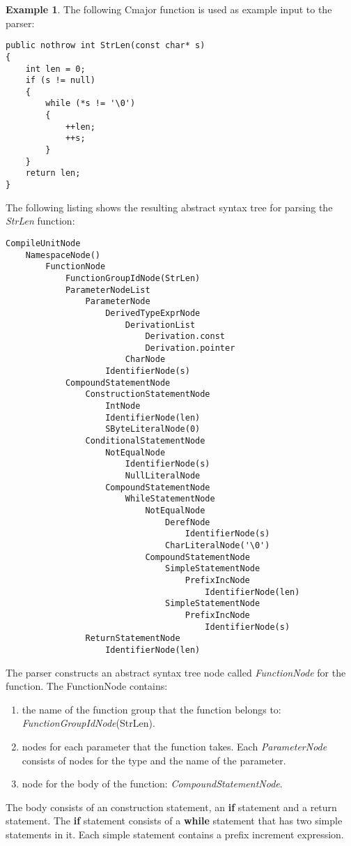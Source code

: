 \documentclass[a4paper,oneside,11pt]{book}
\theoremstyle{definition}
\newtheorem{exmp}{Example}[section]
\begin{document}
\begin{exmp}
The following Cmajor function is used as example input to the parser:

\lstset{language=Cmajor}
\begin{lstlisting}[frame=trBL]
public nothrow int StrLen(const char* s)
{
    int len = 0;
    if (s != null)
    {
        while (*s != '\0')
        {
            ++len;
            ++s;
        }
    }
    return len;
}
\end{lstlisting}

The following listing shows the resulting abstract syntax tree for parsing the \emph{StrLen} function:

\begin{verbatim}
CompileUnitNode
    NamespaceNode()
        FunctionNode
            FunctionGroupIdNode(StrLen)
            ParameterNodeList
                ParameterNode
                    DerivedTypeExprNode
                        DerivationList
                            Derivation.const
                            Derivation.pointer
                        CharNode
                    IdentifierNode(s)
            CompoundStatementNode
                ConstructionStatementNode
                    IntNode
                    IdentifierNode(len)
                    SByteLiteralNode(0)
                ConditionalStatementNode
                    NotEqualNode
                        IdentifierNode(s)
                        NullLiteralNode
                    CompoundStatementNode
                        WhileStatementNode
                            NotEqualNode
                                DerefNode
                                    IdentifierNode(s)
                                CharLiteralNode('\0')
                            CompoundStatementNode
                                SimpleStatementNode
                                    PrefixIncNode
                                        IdentifierNode(len)
                                SimpleStatementNode
                                    PrefixIncNode
                                        IdentifierNode(s)
                ReturnStatementNode
                    IdentifierNode(len)
\end{verbatim}

The parser constructs an abstract syntax tree node called \emph{FunctionNode} for the function.
The FunctionNode contains:
\begin{enumerate}
\item
the name of the function group that the function belongs to: \emph{FunctionGroupIdNode}(StrLen).
\item
nodes for each parameter that the function takes.
Each \emph{ParameterNode} consists of nodes for the type and the name of the parameter.
\item
node for the body of the function: \emph{CompoundStatementNode}.
\end{enumerate}

The body consists of an construction statement, an \textbf{if} statement
and a return statement. The \textbf{if} statement consists of a
\textbf{while} statement that has two simple statements in it.
Each simple statement contains a prefix increment expression.
\end{exmp}
\end{document}
